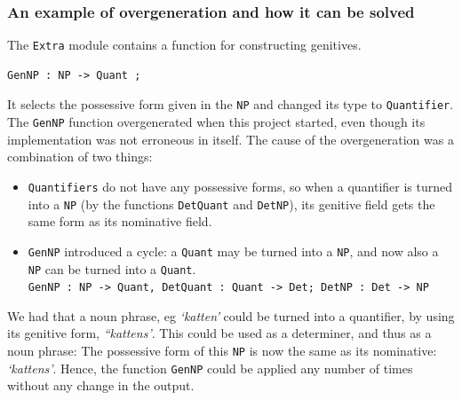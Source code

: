 \documentclass{report}
\begin{document}




\subsubsection{An example of overgeneration and how it can be solved}
The \verb-Extra- module contains a function for constructing genitives.
\begin{verbatim}GenNP : NP -> Quant ;\end{verbatim}
It selects the possessive form given in the \verb-NP- and changed its type
to \verb-Quantifier-. 
The \verb-GenNP- function %
overgenerated when this project started, even
though its implementation was not erroneous in itself. The cause of the overgeneration 
was a combination of two things:
\begin{itemize}
\item \verb-Quantifiers- do not have any possessive
forms, so when a quantifier is turned into
a \verb-NP- (by the functions \verb-DetQuant- and \verb-DetNP-), its genitive field gets
the same form as its nominative field.
\item\verb-GenNP-
introduced a cycle: a \verb-Quant- may be turned into a \verb-NP-, and now also
a \verb-NP- can be turned into a \verb-Quant-.\\
\verb|GenNP : NP -> Quant, DetQuant : Quant -> Det; DetNP : Det -> NP|
\end{itemize}
We had that a noun phrase, eg \emph{`katten'} could be turned into a quantifier,
by using its genitive form, \emph{``kattens'}. This could be used as a determiner,
and thus as a noun phrase:
The possessive form of this \verb-NP- is now the same as its nominative:
\emph{`kattens'}. Hence, the function \verb-GenNP- could be applied
any number of times without any change in the output.
\end{document}
